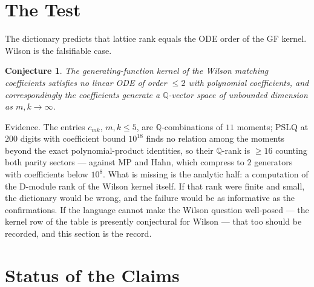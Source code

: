 \documentclass[11pt,a4paper]{article}
\newtheorem{conjecture}{Conjecture}[section]
\newcommand{\Q}{\mathbb{Q}}
\begin{document}
\section{The Test}\label{sec:test}

The dictionary predicts that lattice rank equals the ODE order of the
GF kernel. Wilson is the falsifiable case.

\begin{conjecture}\label{conj:wilson}
The generating-function kernel of the Wilson matching coefficients
satisfies no linear ODE of order $\le 2$ with polynomial coefficients,
and correspondingly the coefficients generate a $\Q$-vector space of
unbounded dimension as $m,k \to \infty$.
\end{conjecture}

Evidence. The entries $c_{mk}$, $m,k \le 5$, are $\Q$-combinations of
$11$ moments; PSLQ at $200$ digits with coefficient bound $10^{18}$
finds no relation among the moments beyond the exact
polynomial-product identities, so their $\Q$-rank is $\ge 16$ counting
both parity sectors --- against MP and Hahn, which compress to $2$
generators with coefficients below $10^{8}$. What is missing is the
analytic half: a computation of the D-module rank of the Wilson kernel
itself. If that rank were finite and small, the dictionary would be
wrong, and the failure would be as informative as the confirmations.
If the language cannot make the Wilson question well-posed --- the
kernel row of the table is presently conjectural for Wilson --- that
too should be recorded, and this section is the record.

\section{Status of the Claims}
\end{document}
